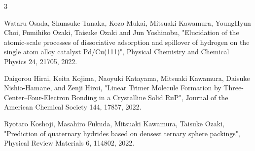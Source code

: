 \begin{雑誌論文}{3}

Wataru Osada, Shunsuke Tanaka, Kozo Mukai, Mitsuaki Kawamura, YoungHyun Choi, Fumihiko Ozaki, Taisuke Ozaki and Jun Yoshinobu, 
"Elucidation of the atomic-scale processes of dissociative adsorption and spillover of hydrogen on the single atom alloy catalyst Pd/Cu(111)",
Physical Chemistry and Chemical Physics 24, 21705, 2022.

Daigorou Hirai, Keita Kojima, Naoyuki Katayama, Mitsuaki Kawamura, Daisuke Nishio-Hamane, and Zenji Hiroi,
"Linear Trimer Molecule Formation by Three-Center–Four-Electron Bonding in a Crystalline Solid RuP",
Journal of the American Chemical Society 144, 17857, 2022.

Ryotaro Koshoji, Masahiro Fukuda, Mitsuaki Kawamura, Taisuke Ozaki,
"Prediction of quaternary hydrides based on densest ternary sphere packings",
Physical Review Materials 6, 114802, 2022.

\end{雑誌論文}